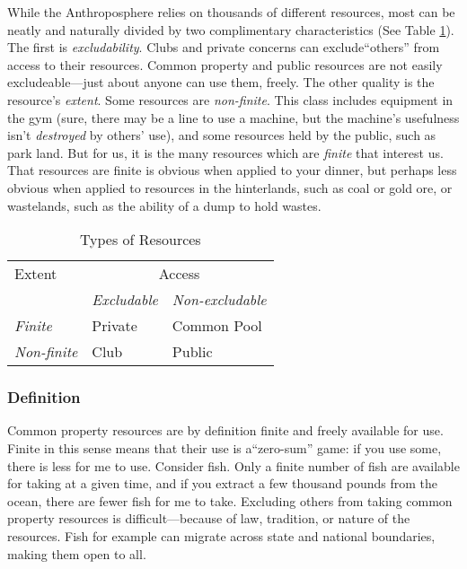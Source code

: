 \documentclass[amstex,12pt]{book}
\begin{document}
While the Anthroposphere relies on thousands of different resources, most can be neatly and naturally divided by two complimentary characteristics (See Table \ref{tab:goods}). The first is \emph{excludability}. Clubs and private concerns can exclude``others'' from access to their resources. Common property and public resources are not easily excludeable---just about anyone can use them, freely. The other quality is the resource's \emph{extent}. Some resources are \emph{non-finite}. This class includes equipment in the gym (sure, there may be a line to use a machine, but the machine's usefulness isn't \textit{destroyed} by others' use), and some resources held by the public, such as park land. But for us, it is the many resources which are \emph{finite} that interest us. That resources are finite is obvious when applied to your dinner, but perhaps less obvious when applied to resources in the hinterlands, such as coal or gold ore, or wastelands, such as the ability of a dump to hold wastes.\\

\begin{table} 
\caption{Types of Resources}
\label{tab:goods}
\centering
\begin{tabular}{@{}lll@{}} \toprule
Extent & \multicolumn{2}{c}{Access}\\ \cmidrule(r){2-3} 
 &\emph{Excludable} & \emph{Non-excludable}\\
 \emph{Finite} & Private & Common Pool\\
 \emph{Non-finite} & Club    & Public\\ \bottomrule
\end{tabular}
\end{table}

\subsubsection{Definition}
Common property resources are by definition finite and freely available for use. Finite in this sense means that their use is a``zero-sum'' game: if you use some, there is less for me to use. Consider fish. Only a finite number of fish are available for taking at a given time, and if you extract a few thousand pounds from the ocean, there are fewer fish for me to take. Excluding others from taking common property resources is difficult---because of law, tradition, or nature of the resources. Fish for example can migrate across state and national boundaries, making them open to all.\\
\end{document}

